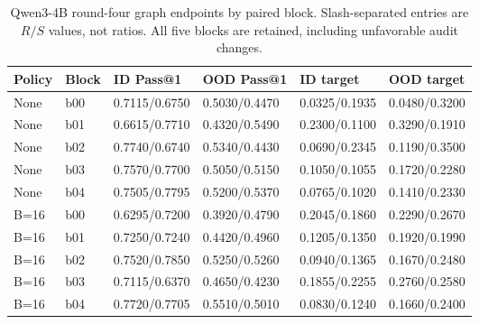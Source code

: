 \begin{table}[H]
\caption{Qwen3-4B round-four graph endpoints by paired block. Slash-separated entries are $R/S$ values, not ratios. All five blocks are retained, including unfavorable audit changes.}
\label{tab:qwen4b-blocks}
\centering\small\setlength{\tabcolsep}{3pt}
\begin{tabular}{@{}llllll@{}}
\toprule
Policy & Block & ID Pass@1 & OOD Pass@1 & ID target & OOD target\\
\midrule
None & b00 & 0.7115/0.6750 & 0.5030/0.4470 & 0.0325/0.1935 & 0.0480/0.3200\\
None & b01 & 0.6615/0.7710 & 0.4320/0.5490 & 0.2300/0.1100 & 0.3290/0.1910\\
None & b02 & 0.7740/0.6740 & 0.5340/0.4430 & 0.0690/0.2345 & 0.1190/0.3500\\
None & b03 & 0.7570/0.7700 & 0.5050/0.5150 & 0.1050/0.1055 & 0.1720/0.2280\\
None & b04 & 0.7505/0.7795 & 0.5200/0.5370 & 0.0765/0.1020 & 0.1410/0.2330\\
B=16 & b00 & 0.6295/0.7200 & 0.3920/0.4790 & 0.2045/0.1860 & 0.2290/0.2670\\
B=16 & b01 & 0.7250/0.7240 & 0.4420/0.4960 & 0.1205/0.1350 & 0.1920/0.1990\\
B=16 & b02 & 0.7520/0.7850 & 0.5250/0.5260 & 0.0940/0.1365 & 0.1670/0.2480\\
B=16 & b03 & 0.7115/0.6370 & 0.4650/0.4230 & 0.1855/0.2255 & 0.2760/0.2580\\
B=16 & b04 & 0.7720/0.7705 & 0.5510/0.5010 & 0.0830/0.1240 & 0.1660/0.2400\\
\bottomrule
\end{tabular}
\end{table}
